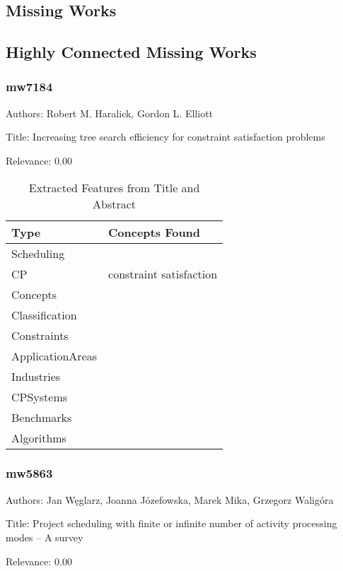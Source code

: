 \subsection{Missing Works}

\subsection{Highly Connected Missing Works}

\subsubsection{mw7184}
\label{mw:mw7184}

Authors: Robert M. Haralick, Gordon L. Elliott

Title: Increasing tree search efficiency for constraint satisfaction problems

Relevance:  0.00

{\scriptsize
\begin{longtable}{p{2cm}p{20cm}}
\caption{Extracted Features from Title and Abstract}\\ \toprule
Type & Concepts Found\\ \midrule
\endhead
\bottomrule
\endfoot
Scheduling & \\ 
CP & constraint satisfaction\\ 
Concepts & \\ 
Classification & \\ 
Constraints & \\ 
ApplicationAreas & \\ 
Industries & \\ 
CPSystems & \\ 
Benchmarks & \\ 
Algorithms & \\ 
\end{longtable}
}



\subsubsection{mw5863}
\label{mw:mw5863}

Authors: Jan Węglarz, Joanna Józefowska, Marek Mika, Grzegorz Waligóra

Title: Project scheduling with finite or infinite number of activity processing modes – A survey

Relevance:  0.00

